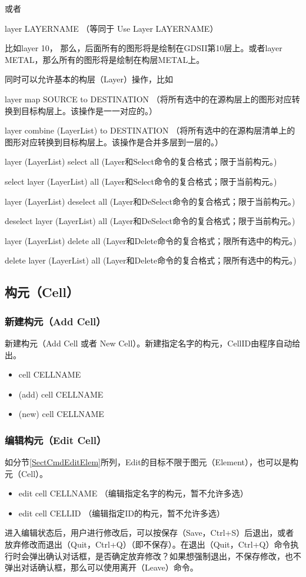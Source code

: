 或者

layer LAYERNAME （等同于 Use Layer LAYERNAME）

比如layer 10， 那么，后面所有的图形将是绘制在GDSII第10层上。或者layer METAL，那么所有的图形将是绘制在构层METAL上。

同时可以允许基本的构层（Layer）操作，比如

layer map SOURCE to DESTINATION （将所有选中的在源构层上的图形对应转换到目标构层上。该操作是一一对应的。）

layer combine (LayerList) to DESTINATION （将所有选中的在源构层清单上的图形对应转换到目标构层上。该操作是合并多层到一层的。）

layer (LayerList) select all (Layer和Select命令的复合格式；限于当前构元。)

select layer (LayerList) all (Layer和Select命令的复合格式；限于当前构元。)

layer (LayerList) deselect all (Layer和DeSelect命令的复合格式；限于当前构元。)

deselect layer (LayerList) all (Layer和DeSelect命令的复合格式；限于当前构元。)

layer (LayerList) delete all (Layer和Delete命令的复合格式；限所有选中的构元。)

delete layer (LayerList) all (Layer和Delete命令的复合格式；限所有选中的构元。)

\subsection{构元（Cell）} \label{SectCmdCell}

\subsubsection{新建构元（Add Cell）} \label{SectCmdNewCell}
新建构元（Add Cell 或者 New Cell）。新建指定名字的构元，CellID由程序自动给出。
\begin{itemize}
	\item cell CELLNAME 
	\item (add) cell CELLNAME
	\item (new) cell CELLNAME
\end{itemize}

\subsubsection{编辑构元（Edit Cell）} \label{SectCmdEditCell}
如分节\ref{SectCmdEditElem}所列，Edit的目标不限于图元（Element），也可以是构元（Cell）。
\begin{itemize}
	\item edit cell CELLNAME （编辑指定名字的构元，暂不允许多选）
	\item edit cell CELLID （编辑指定ID的构元，暂不允许多选）
\end{itemize}
进入编辑状态后，用户进行修改后，可以按保存（Save，Ctrl+S）后退出，或者放弃修改而退出（Quit，Ctrl+Q）（即不保存）。在退出（Quit，Ctrl+Q）命令执行时会弹出确认对话框，是否确定放弃修改？如果想强制退出，不保存修改，也不弹出对话确认框，那么可以使用离开（Leave）命令。

